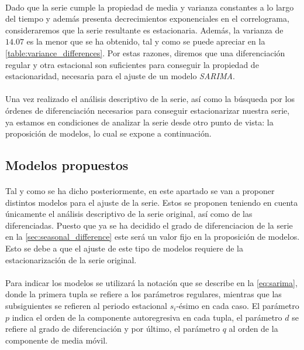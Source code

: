 \documentclass[a4paper, spanish]{article}
\begin{document}
        \paragraph{}
        Dado que la serie cumple la propiedad de media y varianza constantes a lo largo del tiempo y además presenta decrecimientos exponenciales en el correlograma, consideraremos que la serie resultante es estacionaria. Además, la varianza de $14.07$ es la menor que se ha obtenido, tal y como se puede apreciar en la \autoref{table:variance_differences}. Por estas razones, diremos que una diferenciación regular y otra estacional son suficientes para conseguir la propiedad de estacionaridad, necesaria para el ajuste de un modelo \emph{SARIMA}.

    \paragraph{}
    Una vez realizado el análisis descriptivo de la serie, así como la búsqueda por los órdenes de diferenciación necesarios para conseguir estacionarizar nuestra serie, ya estamos en condiciones de analizar la serie desde otro punto de vista: la proposición de modelos, lo cual se expone a continuación.

    \subsection{Modelos propuestos}
    \label{sec:proposed_models}

      \paragraph{}
      Tal y como se ha dicho posteriormente, en este apartado se van a proponer distintos modelos para el ajuste de la serie. Estos se proponen teniendo en cuenta únicamente el análisis descriptivo de la serie original, así como de las diferenciadas. Puesto que ya se ha decidido el grado de diferenciacion de la serie en la \autoref{sec:seasonal_difference} este será un valor fijo en la proposición de modelos. Esto se debe a que el ajuste de este tipo de modelos requiere de la estacionarización de la serie original.

      \paragraph{}
      Para indicar los modelos se utilizará la notación que se describe en la \autoref{eq:sarima}, donde la primera tupla se refiere a los parámetros regulares, mientras que las subsiguientes se refieren al periodo estacional $s_i$-ésimo en cada caso. El parámetro $p$ indica el orden de la componente autoregresiva en cada tupla, el parámetro $d$ se refiere al grado de diferenciación y por último, el parámetro $q$ al orden de la componente de media móvil.
\end{document}

